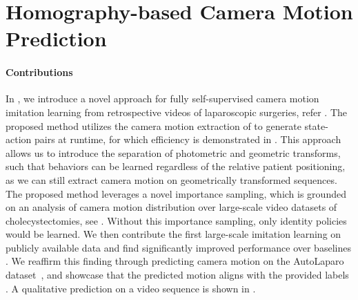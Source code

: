 \section{Homography-based Camera Motion Prediction}
\label{con:sec:hom_pred}
\paragraph{Contributions} In , we introduce a novel approach for fully self-supervised camera motion imitation learning from retrospective videos of laparoscopic surgeries, refer . The proposed method utilizes the camera motion extraction of  to generate state-action pairs at runtime, for which efficiency is demonstrated in . This approach allows us to introduce the separation of photometric and geometric transforms, such that behaviors can be learned regardless of the relative patient positioning, as we can still extract camera motion on geometrically transformed sequences. The proposed method leverages a novel importance sampling, which is grounded on an analysis of camera motion distribution over large-scale video datasets of cholecystectomies, see . Without this importance sampling, only identity policies would be learned. We then contribute the first large-scale imitation learning on publicly available data and find significantly improved performance over baselines . We reaffirm this finding through predicting camera motion on the AutoLaparo dataset~\cite{wang2022autolaparo}, and showcase that the predicted motion aligns with the provided labels . A qualitative prediction on a video sequence is shown in .

